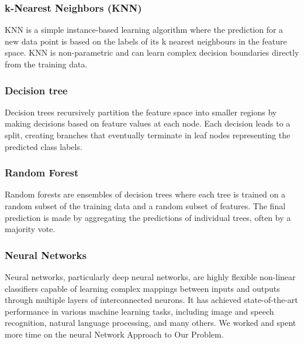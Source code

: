 \subsubsection{k-Nearest Neighbors (KNN)}KNN is a simple instance-based learning algorithm where the prediction for a new data point is based on the labels of its k nearest neighbours in the feature space. KNN is non-parametric and can learn complex decision boundaries directly from the training data.
\subsubsection{Decision tree}Decision trees recursively partition the feature space into smaller regions by making decisions based on feature values at each node. Each decision leads to a split, creating branches that eventually terminate in leaf nodes representing the predicted class labels.
\subsubsection{Random Forest}Random forests are ensembles of decision trees where each tree is trained on a random subset of the training data and a random subset of features. The final prediction is made by aggregating the predictions of individual trees, often by a majority vote.
\subsubsection{Neural Networks}Neural networks, particularly deep neural networks, are highly flexible non-linear classifiers capable of learning complex mappings between inputs and outputs through multiple layers of interconnected neurons. It has achieved state-of-the-art performance in various machine learning tasks, including image and speech recognition, natural language processing, and many others. We worked and spent more time on the neural Network Approach to Our Problem.